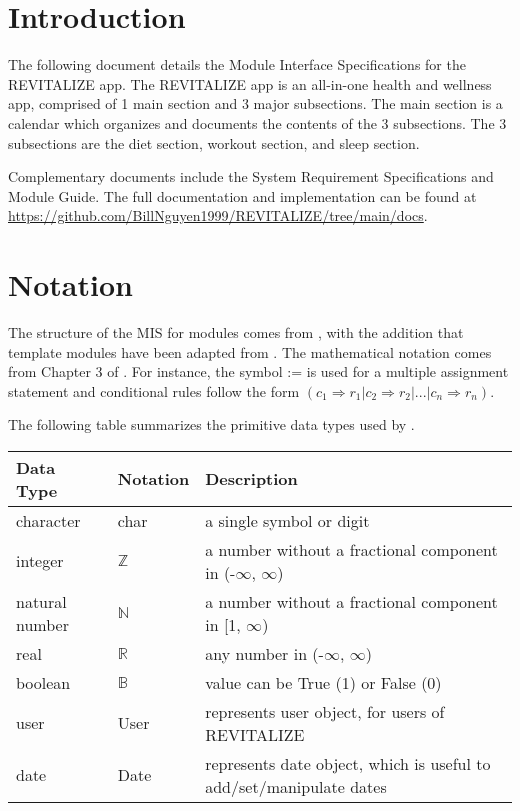\documentclass[12pt, titlepage]{article}
\begin{document}
\newpage

\tableofcontents

\newpage


\section{Introduction}

The following document details the Module Interface Specifications for
the REVITALIZE app. The REVITALIZE app is an all-in-one health and wellness app, comprised of 1 main 
section and 3 major subsections. The main section is a calendar which organizes and documents the contents of the 3 subsections. 
The 3 subsections are the diet section, workout section, and sleep section.

Complementary documents include the System Requirement Specifications
and Module Guide.  The full documentation and implementation can be
found at \url{https://github.com/BillNguyen1999/REVITALIZE/tree/main/docs}.

\section{Notation}

The structure of the MIS for modules comes from \citet{HoffmanAndStrooper1995},
with the addition that template modules have been adapted from
\cite{GhezziEtAl2003}.  The mathematical notation comes from Chapter 3 of
\citet{HoffmanAndStrooper1995}.  For instance, the symbol := is used for a
multiple assignment statement and conditional rules follow the form $(c_1
\Rightarrow r_1 | c_2 \Rightarrow r_2 | ... | c_n \Rightarrow r_n )$.

The following table summarizes the primitive data types used by \progname. 

\begin{center}
	\renewcommand{\arraystretch}{1.2}
	\noindent 
	\begin{tabular}{l l p{7.5cm}} 
		\toprule 
		\textbf{Data Type} & \textbf{Notation} & \textbf{Description}\\ 
		\midrule
		character & char & a single symbol or digit\\
		integer & $\mathbb{Z}$ & a number without a fractional component in (-$\infty$, $\infty$) \\
		natural number & $\mathbb{N}$ & a number without a fractional component in [1, $\infty$) \\
		real & $\mathbb{R}$ & any number in (-$\infty$, $\infty$)\\
		boolean & $\mathbb{B}$ & value can be True (1) or False (0)\\
		user & User & represents user object, for users of REVITALIZE\\
		date & Date & represents date object, which is useful to add/set/manipulate dates\\
		\bottomrule
	\end{tabular} 
\end{center}
\end{document}

